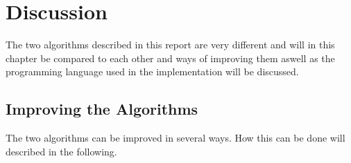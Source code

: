 \chapter{Discussion}
\emptyTop{}
The two algorithms described in this report are very different and will in this chapter be compared to each other and ways of improving them aswell as the programming language used in the implementation will be discussed. 




\section{Improving the Algorithms}
The two algorithms can be improved in several ways. How this can be done will described in the following. 



